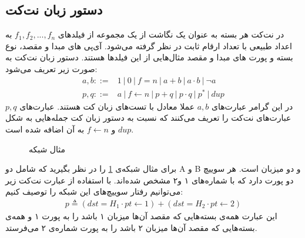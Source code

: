 \documentclass[
msc,
irfonts
]{./tex/tehran-thesis}
\newcommand{\پ}{پروژه/پایان‌نامه/رساله }
\theoremstyle{definition}
\theoremstyle{theorem}
\theoremstyle{definition}
\numberwithin{algorithm}{chapter}
\newcommand{\la}{\leftarrow}
\newcommand{\lf}[1]{\LTRfootnote{#1}}
\begin{document}
\subsection{دستور زبان نت‌کت}
در نت‌کت هر بسته
به عنوان یک نگاشت از یک مجموعه از فیلد‌های
$f_1,f_2,...,f_n$
به اعداد طبیعی با تعداد ارقام ثابت در نظر گرفته می‌شود.
آی‌پی‌\lf{IP}
های مبدا و مقصد، نوع بسته و پورت‌\lf{Port}
های مبدا و مقصد مثال‌هایی از این فیلد‌ها هستند.
دستور زبان نت‌کت به صورت زیر تعریف می‌شود:
\begin{align*}
    a,b ::= & 1 ~|~ 0 ~|~ f = n ~|~ a + b ~|~ a \cdot b ~|~ \neg a  \\
    p,q ::= & a ~|~ f \la n ~|~ p + q ~|~ p \cdot q ~|~ p^* ~|~ dup
\end{align*}
در این گرامر عبارت‌های
$a,b$
عملا معادل با تست‌های زبان کت\lf{KAT}
هستند.
عبارت‌های
$p,q$
عبارت‌های نت‌کت را تعریف می‌کنند که نسبت به دستور زبان کت
جمله‌هایی به شکل
$dup$
و
$f \la n$
به آن اضافه شده است.
\begin{figure}
    \centering
    \caption{مثال شبکه}
    \label{fig:netkat:ssh}
\end{figure}
برای مثال شبکه‌ی
\ref{fig:netkat:ssh}
را در نظر بگیرید که شامل دو\lf{Switch}
A و ‌B
و دو میزبان\lf{Host}
است.
هر سوییچ دو پورت دارد که با شماره‌های ۱ و۲ مشخص شده‌اند.
با استفاده از عبارت نت‌کت زیر می‌توانیم رفتار سوییچ‌های این شبکه را توصیف کنیم:
\begin{align}
    \label{eq:netkat:swp}
    p \triangleq (dst = H_1 \cdot pt \la 1) +
    (dst = H_2 \cdot pt \la 2)
\end{align}
این عبارت همه‌ی بسته‌هایی که مقصد آن‌ها میزبان ۱ باشد را به پورت ۱ و همه‌ی بسته‌هایی که مقصد‌ آن‌ها میزبان ۲ باشد را به پورت شماره‌ی ۲ می‌فرستد.
\end{document}
